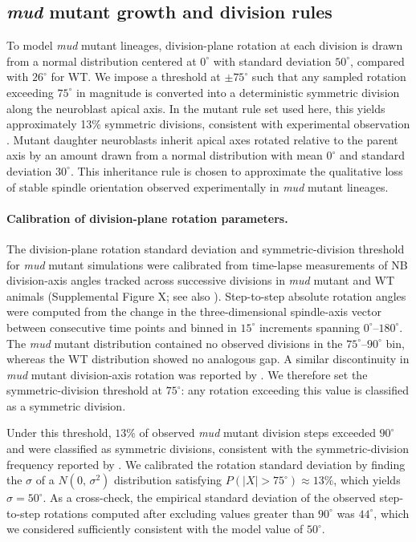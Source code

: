 \subsection{\textit{mud} mutant growth and division rules}
To model \textit{mud} mutant lineages, division-plane rotation at each division is drawn from a normal distribution centered at \(0^\circ\) with standard deviation \(50^\circ\), compared with \(26^\circ\) for WT.
We impose a threshold at \(\pm 75^\circ\) such that any sampled rotation exceeding \(75^\circ\) in magnitude is converted into a deterministic symmetric division along the neuroblast apical axis.
In the mutant rule set used here, this yields approximately 13\% symmetric divisions, consistent with experimental observation \cite{cabernard_2009_apicalbasalspindlea}.
Mutant daughter neuroblasts inherit apical axes rotated relative to the parent axis by an amount drawn from a normal distribution with mean \(0^\circ\) and standard deviation \(30^\circ\).
This inheritance rule is chosen to approximate the qualitative loss of stable spindle orientation observed experimentally in \textit{mud} mutant lineages.

\paragraph{Calibration of division-plane rotation parameters.}
The division-plane rotation standard deviation and symmetric-division threshold for \textit{mud} mutant simulations were calibrated from time-lapse measurements of NB division-axis angles tracked across successive divisions in \textit{mud} mutant and WT animals (Supplemental Figure X; see also \cite{cabernard_2009_apicalbasalspindlea}).
Step-to-step absolute rotation angles were computed from the change in the three-dimensional spindle-axis vector between consecutive time points and binned in \(15^\circ\) increments spanning \(0^\circ\)--\(180^\circ\).
The \textit{mud} mutant distribution contained no observed divisions in the \(75^\circ\)--\(90^\circ\) bin, whereas the WT distribution showed no analogous gap.
A similar discontinuity in \textit{mud} mutant division-axis rotation was reported by \cite{cabernard_2009_apicalbasalspindlea}.
We therefore set the symmetric-division threshold at \(75^\circ\): any rotation exceeding this value is classified as a symmetric division.

Under this threshold, \(13\%\) of observed \textit{mud} mutant division steps exceeded \(90^\circ\) and were classified as symmetric divisions, consistent with the symmetric-division frequency reported by \cite{cabernard_2009_apicalbasalspindlea}.
We calibrated the rotation standard deviation by finding the \(\sigma\) of a \(N(0,\,\sigma^2)\) distribution satisfying \(P(|X| > 75^\circ) \approx 13\%\), which yields \(\sigma = 50^\circ\).
As a cross-check, the empirical standard deviation of the observed step-to-step rotations computed after excluding values greater than \(90^\circ\) was \(44^\circ\), which we considered sufficiently consistent with the model value of \(50^\circ\).

